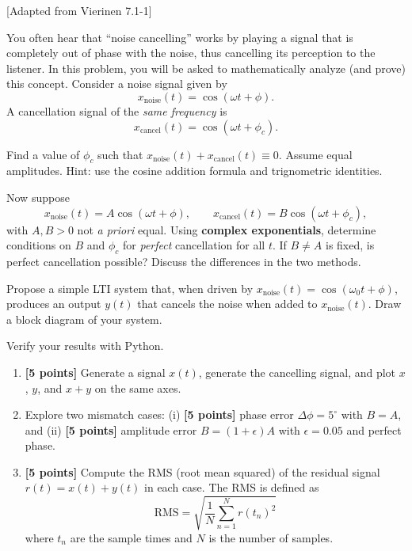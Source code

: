 \documentclass{ee102_pset}
\author{\rule{3cm}{0.4pt}} %
\begin{document}
 [Adapted from Vierinen 7.1-1]

You often hear that ``noise cancelling'' works by playing a signal that is completely out of phase with the noise, thus cancelling its perception to the listener. In this problem, you will be asked to mathematically analyze (and prove) this concept. Consider a noise signal given by
\[
x_{\text{noise}}(t)=\cos(\omega t+\phi).
\]
A cancellation signal of the \emph{same frequency} is
\[
x_{\text{cancel}}(t)=\cos(\omega t+\phi_c).
\]

\problempart{\textbf{[10 points]}}
Find a value of $\phi_c$ such that $x_{\text{noise}}(t)+x_{\text{cancel}}(t)\equiv 0$. Assume equal amplitudes. Hint: use the cosine addition formula and trignometric identities.

\medskip

\problempart{\textbf{[15 points]}} Now suppose
\[
x_{\text{noise}}(t)=A\cos(\omega t+\phi),\qquad
x_{\text{cancel}}(t)=B\cos(\omega t+\phi_c),
\]
with $A,B>0$ not \emph{a priori} equal. Using \textbf{complex exponentials}, determine conditions on $B$ and $\phi_c$ for \emph{perfect} cancellation for all $t$. If $B\neq A$ is fixed, is perfect cancellation possible? Discuss the differences in the two methods.



\problempart{\textbf{[5 points]}}
Propose a simple LTI system that, when driven by $x_{\text{noise}}(t)=\cos(\omega_0 t+\phi)$, produces an output $y(t)$ that cancels the noise when added to $x_{\text{noise}}(t)$. Draw a block diagram of your system.

\problempart
Verify your results with Python.
\begin{enumerate}
    \item \textbf{[5 points]} Generate a signal $x(t)$, generate the cancelling signal, and plot $x$, $y$, and $x+y$ on the same axes.
    \item Explore two mismatch cases: (i) \textbf{[5 points]} phase error $\Delta\phi=5^\circ$ with $B=A$, and (ii) \textbf{[5 points]} amplitude error $B=(1+\epsilon)A$ with $\epsilon=0.05$ and perfect phase.
    \item \textbf{[5 points]} Compute the RMS (root mean squared) of the residual signal $r(t)=x(t)+y(t)$ in each case. The RMS is defined as
    \[
\text{RMS} = \sqrt{\frac{1}{N}\sum_{n=1}^{N} r(t_n)^2}
\]
where $t_n$ are the sample times and $N$ is the number of samples.
\end{enumerate}
\end{document}
